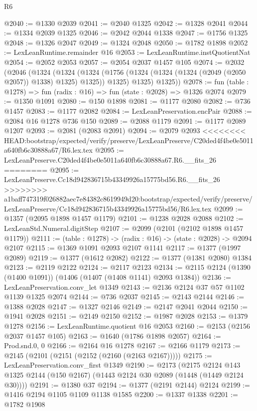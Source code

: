 \begin{lexlean}{R6}
\begin{coremodule}
{{{{{{{{{{{{{{{{{{{{{{{{{{{{{{{{{{{{{{{{{{{{{{{{{{@2040 := @1330 @2039
@2041 := @2040 @1325
@2042 := @1328 @2041
@2044 := @1334 @2039 @1325
@2046 := @2042 @2044 @1338
@2047 := @1756 @1325
@2048 := @1326 @2047
@2049 := @1324 @2048
@2050 := @1782 @1898
@2052 := LexLeanRuntime.remainder @16
@2053 := LexLeanRuntime.instQuotientNat
@2054 := @2052 @2053
@2057 := @2054 @2037 @1457 @105
@2074 := @2032
    (@2046
      (@1324
        (@1324
          (@1324 (@1756 (@1324 (@1324 (@1324 (@2049 (@2050 @2057)) @1338) @1325) @1325)) @1325)
          @1325)
        @1325))
@2078 := fun (table : @1278) => fun (radix : @16) => fun (state : @2028) => @1326 @2074
@2079 := @1350 @1091
@2080 := @150 @1898
@2081 := @1177 @2080
@2082 := @736 @1457
@2083 := @1177 @2082
@2084 := LexLeanPreservation.encPair
@2088 := @2084 @16 @1278 @736 @150
@2089 := @2088 @1179
@2091 := @1177 @2089 @1207
@2093 := @2081 (@2083 @2091)
@2094 := @2079 @2093
<<<<<<<< HEAD:bootstrap/expected/verify/preserve/LexLeanPreserve/C20ded4f4be0e5011a640fb6c30888a67/R6.lex.tex
@2095 := LexLeanPreserve.C20ded4f4be0e5011a640fb6c30888a67.R6.__fits_26
========
@2095 := LexLeanPreserve.Cc18d942836715b43349926a15775bd56.R6.__fits_26
>>>>>>>> a1baff747319f026882aec7e84382c8619949d20:bootstrap/expected/verify/preserve/LexLeanPreserve/Cc18d942836715b43349926a15775bd56/R6.lex.tex
@2099 := @1357 (@2095 @1898 @1457 @1179)
@2101 := @1238 @2028 @2088
@2102 := LexLeanStd.Numeral.digitStep
@2107 := @2099 (@2101 (@2102 @1898 @1457 @1179))
@2111 := (table : @1278) -> (radix : @16) -> (state : @2028) -> @2094 @2107
@2115 := @1369 @1091 @2093 @2107 @1141
@2117 := @1377 (@1997 @2089)
@2119 := @1377 (@1612 @2082)
@2122 := @1377 (@1381 @2080) @1384
@2123 := @2119 @2122
@2124 := @2117 @2123
@2134 := @2115 @2124 (@1390 (@1400 @1091)) (@1406 (@1407 (@1408 @1141) @2093 @1384))
@2136 := LexLeanPreservation.conv_let @1349
@2143 := @2136 @2124 @37 @57 @1102 @1139 @1325 @2074
@2144 := @736 @2037
@2145 := @2143 @2144
@2146 := @1388 @2028
@2147 := @1327 @2146
@2149 := @2147 @2041 @2044
@2150 := @1941 @2028
@2151 := @2149 @2150
@2152 := @1987 @2028
@2153 := @1379 @1278
@2156 := LexLeanRuntime.quotient @16 @2053
@2160 := @2153 (@2156 @2037 @1457 @105)
@2163 := @1640 (@1786 @1898 @2057)
@2164 := Prod.snd.{0, 0}
@2166 := @2164 @16 @1278
@2167 := @2166 @1179
@2173 := @2145 (@2101 (@2151 (@2152 (@2160 (@2163 @2167)))))
@2175 := LexLeanPreservation.conv_first @1349
@2190 := @2173
    (@2175 @2124 @143 @1325 @2144 (@150 @2167) (@1443 @2124 @30 @2089 (@1448 (@1449 @2124 @30))))
@2191 := @1380 @37
@2194 := @1377 (@2191 @2144) @2124
@2199 := @1416 @2194 @1105 @1109 @1138 @1585
@2200 := @1337 @1338
@2201 := @1782 @1908
}}}}}}}}}}}}}}}}}}}}}}}}}}}}}}}}}}}}}}}}}}}}}}}}}}
\end{coremodule}
\end{lexlean}
